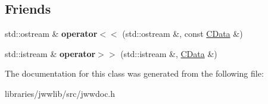 \subsection*{Friends}
\begin{DoxyCompactItemize}
\item 
\hypertarget{classCData_a62b01ac52e467d201eeeed7f86fb69dd}{std\-::ostream \& {\bfseries operator$<$$<$} (std\-::ostream \&, const \hyperlink{classCData}{C\-Data} \&)}\label{classCData_a62b01ac52e467d201eeeed7f86fb69dd}

\item 
\hypertarget{classCData_abb2637e0afcdaf2d7497747c9d1990f1}{std\-::istream \& {\bfseries operator$>$$>$} (std\-::istream \&, \hyperlink{classCData}{C\-Data} \&)}\label{classCData_abb2637e0afcdaf2d7497747c9d1990f1}

\end{DoxyCompactItemize}


The documentation for this class was generated from the following file\-:\begin{DoxyCompactItemize}
\item 
libraries/jwwlib/src/jwwdoc.\-h\end{DoxyCompactItemize}
